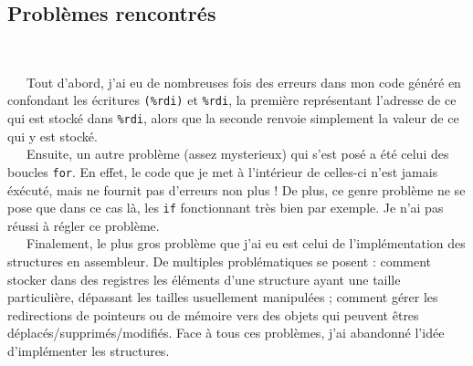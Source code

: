 \documentclass[11pt,a4paper]{article}
\begin{document}
\subsection{Problèmes rencontrés} \

\ \ \ Tout d'abord, j'ai eu de nombreuses fois des erreurs dans mon code généré en confondant les écritures \verb|(%rdi)| et \verb|%rdi|, la première représentant l'adresse de ce qui est stocké dans \verb|%rdi|, alors que la seconde renvoie simplement la valeur de ce qui y est stocké. \\

\ \ \ Ensuite, un autre problème (assez mysterieux) qui s'est posé a été celui des boucles \verb|for|. En effet, le code que je met à l'intérieur de celles-ci n'est jamais éxécuté, mais ne fournit pas d'erreurs non plus ! De plus, ce genre problème ne se pose que dans ce cas là, les \verb|if| fonctionnant très bien par exemple. Je n'ai pas réussi à régler ce problème. \\


\ \ \ Finalement, le plus gros problème que j'ai eu est celui de l'implémentation des structures en assembleur. De multiples problématiques se posent : comment stocker dans des registres les éléments d'une structure ayant une taille particulière, dépassant les tailles usuellement manipulées ; comment gérer les redirections de pointeurs ou de mémoire vers des objets qui peuvent êtres déplacés/supprimés/modifiés. Face à tous ces problèmes, j'ai abandonné l'idée d'implémenter les structures.
\end{document}
